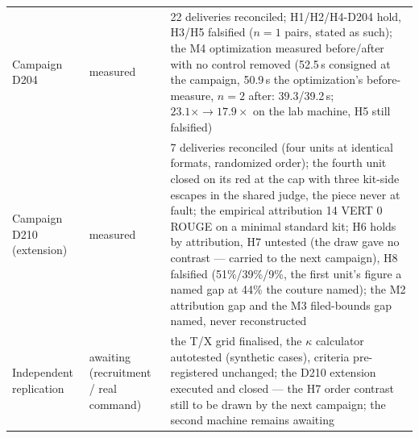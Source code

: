 \begin{longtable}{@{}p{3.4cm} p{2.9cm} p{8.4cm}@{}}
Campaign D204 & measured & 22 deliveries reconciled; H1/H2/H4-D204 hold, H3/H5 falsified ($n{=}1$ pairs, stated as such); the M4 optimization measured before/after with no control removed (52.5\,s consigned at the campaign, 50.9\,s the optimization's before-measure, $n{=}2$ after: 39.3/39.2\,s; $23.1\times \to 17.9\times$ on the lab machine, H5 still falsified) \\
Campaign D210 (extension) & measured & 7 deliveries reconciled (four units at identical formats, randomized order); the fourth unit closed on its red at the cap with three kit-side escapes in the shared judge, the piece never at fault; the empirical attribution 14 VERT 0 ROUGE on a minimal standard kit; H6 holds by attribution, H7 untested (the draw gave no contrast --- carried to the next campaign), H8 falsified (51\%/39\%/9\%, the first unit's figure a named gap at 44\% the couture named); the M2 attribution gap and the M3 filed-bounds gap named, never reconstructed \\
Independent replication & awaiting (recruitment / real command) & the T/X grid finalised, the $\kappa$ calculator autotested (synthetic cases), criteria pre-registered unchanged; the D210 extension executed and closed --- the H7 order contrast still to be drawn by the next campaign; the second machine remains awaiting \\
\end{longtable}\endgroup
